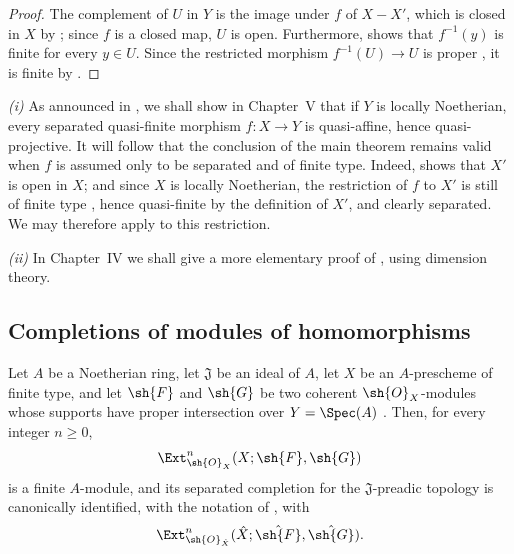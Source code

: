 \begin{proof}
The complement of $U$ in $Y$ is the image under $f$ of $X-X'$, which
is closed in $X$ by ; since $f$ is a closed map,
$U$ is open.  Furthermore,  shows that
$f^{-1}(y)$ is finite for every $y\in U$.  Since the restricted
morphism $f^{-1}(U)\to U$ is proper , it is finite
by .
\end{proof}

\begin{remark}[4.4.12]
\label{III.4.4.12}
\emph{(i)}
As announced in , we shall show in Chapter~V that
if $Y$ is locally Noetherian, every separated quasi-finite morphism
$f:X\to Y$ is quasi-affine, hence quasi-projective.  It will follow
that the conclusion of the main theorem  remains
valid when $f$ is assumed only to be separated and of finite type.
Indeed,  shows that $X'$ is open in $X$; and since
$X$ is locally Noetherian, the restriction of $f$ to $X'$ is still
of finite type , hence quasi-finite by the definition
of $X'$, and clearly separated.  We may therefore apply
 to this restriction.

\emph{(ii)}
In Chapter~IV we shall give a more elementary proof of
, using dimension theory.
\end{remark}


\subsection{Completions of modules of homomorphisms}
\label{subsection:III.4.5}

\begin{proposition}[4.5.1]
\label{III.4.5.1}
Let $A$ be a Noetherian ring, let $\mathfrak J$ be an ideal of $A$,
let $X$ be an $A$-prescheme of finite type, and let $\sh{F}$ and
$\sh{G}$ be two coherent $\sh{O}_X$-modules whose supports have
proper intersection over $Y=\Spec(A)$ .  Then,
for every integer $n\geq0$,
\[
  \Ext^n_{\sh{O}_X}(X;\sh{F},\sh{G})
\]
is a finite $A$-module, and its separated completion for the
$\mathfrak J$-preadic topology is canonically identified, with the
notation of , with
\[
  \Ext^n_{\sh{O}_{\hat{X}}}
    (\hat{X};\hat{\sh{F}},\hat{\sh{G}}).
\]
\end{proposition}

